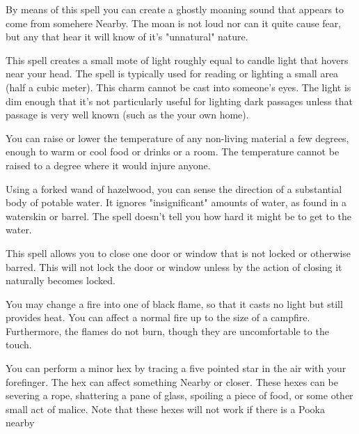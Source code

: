 {  

  By means of this spell you can create a ghostly moaning sound that appears to come from somehere Nearby. The moan is not loud nor can it quite cause fear, but any that hear it will know of it's "unnatural" nature. 


  This spell creates a small mote of light roughly equal to candle light that hovers near your head. The spell is typically used for reading or lighting a small area (half a cubic meter). This charm cannot be cast into someone's eyes. The light is dim enough that it's not particularly useful for lighting dark passages unless that passage is very well known (such as the your own home). 


  You can raise or lower the temperature of any non-living material a few degrees, enough to warm or cool food or drinks or a room.  The temperature cannot be raised to a degree where it would injure anyone.



  Using a forked wand of hazelwood, you can sense the direction of a substantial body of potable water.  It ignores "insignificant" amounts of water, as found in a waterskin or barrel.  The spell doesn’t tell you how hard it might be to get to the water.


  This spell allows you to close one door or window that is not locked or otherwise barred. This will not lock the door or window unless by the action of closing it naturally becomes locked. 


  You may change a fire into one of black flame, so that it casts no light but still provides heat.  You can affect a normal fire up to the size of a campfire.  Furthermore, the flames do not burn, though they are uncomfortable to the touch.


  You can perform a minor hex by tracing a five pointed star in the air with your forefinger. The hex can affect something Nearby or closer.  These hexes can be severing a rope, shattering a pane of glass, spoiling a piece of food, or some other small act of malice.  Note that these hexes will not work if there is a Pooka nearby

}
